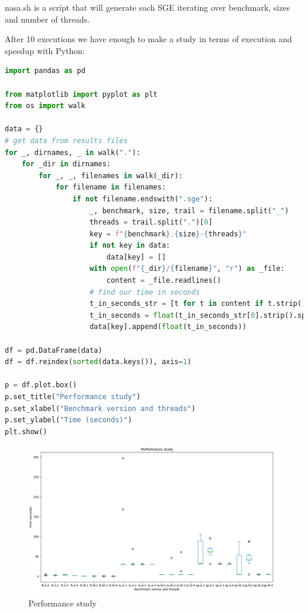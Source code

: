 \documentclass[11pt]{article}
\begin{document}
nasa.sh is a script that will generate each SGE iterating over benchmark, sizes and number of threads.

After 10 executions we have enough to make a study in terms of execution and speedup with Python:

\begin{lstlisting}[language=Python,caption=Python helper script]
import pandas as pd

from matplotlib import pyplot as plt
from os import walk

data = {}
# get data from results files
for _, dirnames, _ in walk("."):
    for _dir in dirnames:
        for _, _, filenames in walk(_dir):
            for filename in filenames:
                if not filename.endswith(".sge"):
                    _, benchmark, size, trail = filename.split("_")
                    threads = trail.split(".")[0]
                    key = f"{benchmark}.{size}-{threads}"
                    if not key in data:
                        data[key] = []
                    with open(f"{_dir}/{filename}", "r") as _file:
                        content = _file.readlines()
                    # find our time in seconds
                    t_in_seconds_str = [t for t in content if t.strip().startswith("Time in seconds")]
                    t_in_seconds = float(t_in_seconds_str[0].strip().split("=")[-1])
                    data[key].append(float(t_in_seconds))

df = pd.DataFrame(data)
df = df.reindex(sorted(data.keys()), axis=1)

p = df.plot.box()
p.set_title("Performance study")
p.set_xlabel("Benchmark version and threads")
p.set_ylabel("Time (seconds)")
plt.show()

\end{lstlisting}

\begin{figure}[ht]    
    \includegraphics{performance.png}
    \caption{Performance study}
    \label{fig:nasa}
\end{figure}
\end{document}
